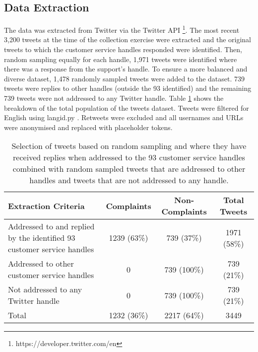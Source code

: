 \subsection{Data Extraction}
The data was extracted from Twitter via the Twitter API \footnote{https://developer.twitter.com/en}. The most recent 3,200 tweets at the time of the collection exercise were extracted and the original tweets to which the customer service handles responded were identified. Then, random sampling equally for each handle, 1,971 tweets were identified where there was a response from the support's handle. To ensure a more balanced and diverse dataset, 1,478 randomly sampled tweets were added to the dataset. 739 tweets were replies to other handles (outside the 93 identified) and the remaining 739 tweets were not addressed to any Twitter handle. Table \ref{tab: tweet_counts} shows the breakdown of the total population of the tweets dataset. Tweets were filtered for English using langid.py \cite{luiLangidPyOfftheshelf2012}. Retweets were excluded and all usernames and URLs were anonymised and replaced with placeholder tokens.
\begin{table}[ht]
    \captionsetup{font=small}
    \centering
    \begin{tabularx}{\textwidth}{|X|c|c|c|}
        \hline
        \rowcolor[gray]{0.7}
        \textbf{Extraction Criteria} & \textbf{Complaints} & \textbf{Non-Complaints} & \textbf{Total Tweets} \\
        \hline
        Addressed to and replied by the identified 93 customer service handles & 1239 \small{(63\%)}  & 739 \small{(37\%)}  & 1971 \small{(58\%)}  \\
        \hline
        Addressed to other customer service handles & 0 & 739 \small{(100\%)} & 739 \small{(21\%)}  \\
        \hline
        Not addressed to any Twitter handle & 0 & 739 \small{(100\%)} & 739 \small{(21\%)}  \\
        \hline    
        \rowcolor[gray]{0.9}
        Total & 1232 \small{(36\%)}  & 2217 \small{(64\%)}  & 3449 \\
        \hline
    \end{tabularx}
    \caption{Selection of tweets based on random sampling and where they have received replies when addressed to the 93 customer service handles combined with random sampled tweets that are addressed to other handles and tweets that are not addressed to any handle.}    
    \label{tab: tweet_counts}
\end{table}  


